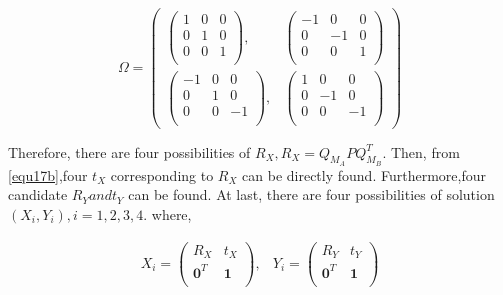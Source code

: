 \documentclass[conference,letterpaper]{IEEEtran}
\begin{document}
\begin{equation}\label{equ19}
\Omega= \left(
\begin{array}{ccc}
\left( \begin{array}{ccc}
       1 & 0 & 0 \\
       0 & 1 & 0 \\
       0 & 0 & 1 \\
\end{array} \right),&
\left( \begin{array}{ccc}
       -1 & 0 & 0 \\
       0 & -1 & 0 \\
       0 & 0 & 1 \\
\end{array} \right)
\\
\left( \begin{array}{ccc}
       -1 & 0 & 0 \\
       0 & 1 & 0 \\
       0 & 0 & -1 \\
\end{array} \right),&
\left( \begin{array}{ccc}
       1 & 0 & 0 \\
       0 & -1 & 0 \\
       0 & 0 & -1 \\
\end{array} \right)
\end{array}
\right)
\end{equation}

Therefore, there are four possibilities of $R_{X}, R_{X}=Q_{M_{A}}PQ_{M_{B}}^T$. Then, from \ref{equ17b},four $t_{X}$ corresponding to $R_{X}$ can be directly found. Furthermore,four candidate $R_{Y} and t_{Y}$ can be found. At last, there are four possibilities of solution $(X_{i},Y_{i}), i = 1,2,3,4$.
where,

\begin{equation}\label{equ20}
\begin{array}{cc}
X_{i}= \left( \begin{array}{cc}
       R_{X} & t_{X} \\
       \mathbf{0}^{T} & \mathbf{1}\\
\end{array} \right),&
Y_{i}= \left( \begin{array}{cc}
       R_{Y} & t_{Y} \\
       \mathbf{0}^{T} & \mathbf{1}\\
\end{array} \right)
\end{array}
\end{equation}
\end{document}
